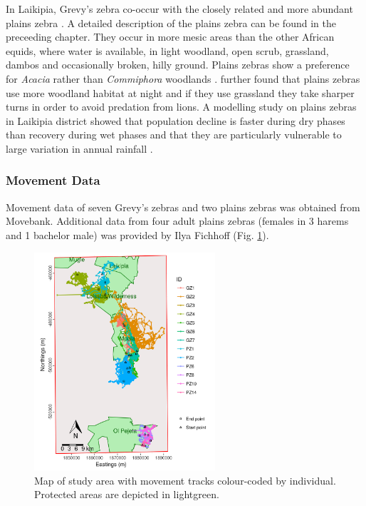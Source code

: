 \documentclass[12pt,a4paper, twoside, english]{article}
\begin{document}
In Laikipia, Grevy's zebra co-occur with the closely related and more abundant plains zebra \citep{Sundaresan2012}. A detailed description of the plains zebra can be found in the preceeding chapter. They occur in more mesic areas than the other African equids, where water is available, in light woodland, open scrub, grassland, dambos and occasionally broken, hilly ground. Plains zebras show a preference for \textit{Acacia} rather than \textit{Commiphora} woodlands \citep{Grubb1981}. \cite{Fischhoff2007a} further found that plains zebras use more woodland habitat at night and if they use grassland they take sharper turns in order to avoid predation from lions. A modelling study on plains zebras in Laikipia district showed that population decline is faster during dry phases than recovery during wet phases and that they are particularly vulnerable to large variation in annual rainfall \citep{Georgiadis2003}.

\subsubsection{Movement Data}

Movement data of seven Grevy's zebras and two plains zebras was obtained from Movebank. Additional data from four adult plains zebras (females in 3 harems and 1 bachelor male) was provided by Ilya Fichhoff \citep{Fischhoff2007a} (Fig. \ref{fig:zebra_overview_ken}). 

\begin{figure}[H]
  \centering
  \includegraphics[width=0.6\textwidth]{figures/Zebra_KEN_Overview.png}
  \caption[Laikipia zebra movement tracks]{Map of study area with movement tracks colour-coded by individual. Protected areas are depicted in lightgreen.}
  \label{fig:zebra_overview_ken}
\end{figure}
\end{document}
